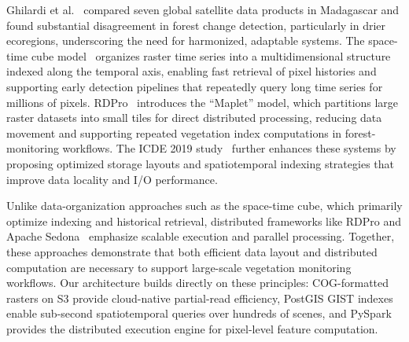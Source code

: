 Ghilardi et al.~\cite{ghilardi2025} compared seven global satellite data products in Madagascar and found substantial disagreement in forest change detection, particularly in drier ecoregions, underscoring the need for harmonized, adaptable systems. The space-time cube model~\cite{verbesselt2010} organizes raster time series into a multidimensional structure indexed along the temporal axis, enabling fast retrieval of pixel histories and supporting early detection pipelines that repeatedly query long time series for millions of pixels. RDPro~\cite{rdpro2024} introduces the ``Maplet'' model, which partitions large raster datasets into small tiles for direct distributed processing, reducing data movement and supporting repeated vegetation index computations in forest-monitoring workflows. The ICDE 2019 study~\cite{yu2019} further enhances these systems by proposing optimized storage layouts and spatiotemporal indexing strategies that improve data locality and I/O performance.

Unlike data-organization approaches such as the space-time cube, which primarily optimize indexing and historical retrieval, distributed frameworks like RDPro and Apache Sedona~\cite{yu2019} emphasize scalable execution and parallel processing. Together, these approaches demonstrate that both efficient data layout and distributed computation are necessary to support large-scale vegetation monitoring workflows. Our architecture builds directly on these principles: COG-formatted rasters on S3 provide cloud-native partial-read efficiency, PostGIS GIST indexes enable sub-second spatiotemporal queries over hundreds of scenes, and PySpark provides the distributed execution engine for pixel-level feature computation.